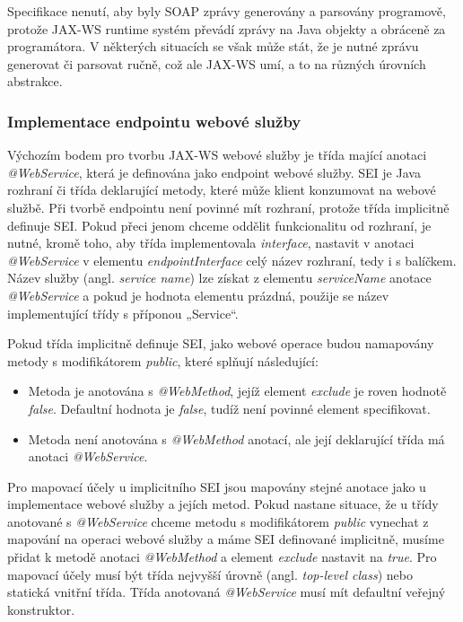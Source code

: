 \documentclass[11pt,twoside,a4paper]{book}
\begin{document}
Specifikace nenutí, aby byly SOAP zprávy generovány a parsovány programově, protože
JAX-WS runtime systém převádí zprávy na Java objekty a obráceně za programátora. V
některých situacích se však může stát, že je nutné zprávu generovat či parsovat ručně, což ale
JAX-WS umí, a to na různých úrovních abstrakce.

\subsubsection{Implementace endpointu webové služby}
\label{subsec:implementace-endpointu-webove-sluzby}

Výchozím bodem pro tvorbu JAX-WS webové služby je třída mající anotaci {\em
@WebService}, která je definována jako endpoint webové služby. SEI je Java
rozhraní či třída deklarující metody, které může klient konzumovat na
webové službě. Při tvorbě endpointu není povinné mít rozhraní, protože třída
implicitně definuje SEI. Pokud přeci jenom chceme oddělit funkcionalitu od
rozhraní, je nutné, kromě toho, aby třída implementovala {\em interface}, nastavit v anotaci
{\em @WebService} v elementu {\em endpointInterface} celý název rozhraní, tedy
i s balíčkem.
Název služby (angl. {\em service name}) lze získat z elementu {\em serviceName}
anotace {\em @WebService} a pokud je hodnota elementu prázdná, použije se název
implementující třídy s příponou „Service“.

Pokud třída implicitně definuje SEI, jako webové operace budou namapovány metody s
modifikátorem {\em public}, které splňují následující:
\begin{itemize}
  \item Metoda je anotována s {\em @WebMethod}, jejíž element {\em exclude} je
  roven hodnotě {\em false}.
Defaultní hodnota je {\em false}, tudíž není povinné
element specifikovat.
  \item Metoda není anotována s {\em @WebMethod} anotací, ale její deklarující třída má anotaci
{\em @WebService}.
\end{itemize}

Pro mapovací účely u implicitního SEI jsou mapovány stejné anotace jako u implementace
webové služby a jejích metod. Pokud nastane situace, že u třídy anotované s {\em @WebService}
chceme metodu s modifikátorem {\em public} vynechat z mapování na
operaci webové služby a máme SEI definované implicitně, musíme přidat k metodě
anotaci {\em @WebMethod} a element {\em exclude} nastavit na {\em true}.
Pro mapovací účely musí být třída nejvyšší úrovně (angl. {\em top-level class})
nebo statická vnitřní třída.
Třída anotovaná {\em @WebService} musí mít defaultní veřejný konstruktor.
\end{document}
